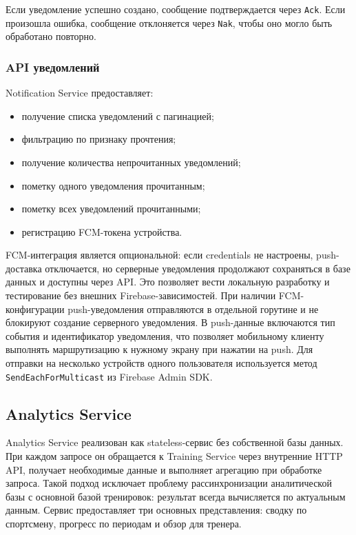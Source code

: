 Если уведомление успешно создано, сообщение подтверждается через \passthrough{\lstinline!Ack!}. Если произошла ошибка, сообщение отклоняется через \passthrough{\lstinline!Nak!}, чтобы оно могло быть обработано повторно.

\subsubsection{API уведомлений}

Notification Service предоставляет:

\begin{itemize}
\tightlist
\item
  получение списка уведомлений с пагинацией;
\item
  фильтрацию по признаку прочтения;
\item
  получение количества непрочитанных уведомлений;
\item
  пометку одного уведомления прочитанным;
\item
  пометку всех уведомлений прочитанными;
\item
  регистрацию FCM-токена устройства.
\end{itemize}

FCM-интеграция является опциональной: если credentials не настроены, push-доставка отключается, но серверные уведомления продолжают сохраняться в базе данных и доступны через API. Это позволяет вести локальную разработку и тестирование без внешних Firebase-зависимостей. При наличии FCM-конфигурации push-уведомления отправляются в отдельной горутине и не блокируют создание серверного уведомления. В push-данные включаются тип события и идентификатор уведомления, что позволяет мобильному клиенту выполнять маршрутизацию к нужному экрану при нажатии на push. Для отправки на несколько устройств одного пользователя используется метод \passthrough{\lstinline!SendEachForMulticast!} из Firebase Admin SDK.

\subsection{Analytics Service}

Analytics Service реализован как stateless-сервис без собственной базы данных. При каждом запросе он обращается к Training Service через внутренние HTTP API, получает необходимые данные и выполняет агрегацию при обработке запроса. Такой подход исключает проблему рассинхронизации аналитической базы с основной базой тренировок: результат всегда вычисляется по актуальным данным. Сервис предоставляет три основных представления: сводку по спортсмену, прогресс по периодам и обзор для тренера.

